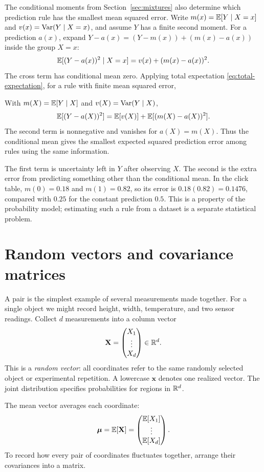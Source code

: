 The conditional moments from Section~\ref{sec:mixtures} also determine
which prediction rule has the smallest mean squared error. Write
\(m(x)=\mathbb{E}[Y\mid X=x]\) and \(v(x)=\operatorname{Var}(Y\mid X=x)\), and assume
\(Y\) has a finite second moment. For a prediction \(a(x)\), expand
\(Y-a(x)=(Y-m(x))+(m(x)-a(x))\) inside the group \(X=x\):
\[
  \mathbb{E}[(Y-a(x))^2\mid X=x]
  =v(x)+(m(x)-a(x))^2.
\]
The cross term has conditional mean zero. Applying total expectation
\eqref{eq:total-expectation}, for a rule with finite mean squared error,
\begin{result}
With \(m(X)=\mathbb{E}[Y\mid X]\) and \(v(X)=\operatorname{Var}(Y\mid X)\),
\[
  \mathbb{E}[(Y-a(X))^2]
  =\mathbb{E}[v(X)]+\mathbb{E}[(m(X)-a(X))^2].
\]
The second term is nonnegative and vanishes for \(a(X)=m(X)\).
Thus the conditional mean gives the smallest expected squared prediction
error among rules using the same information.
\end{result}
The first term is uncertainty left in \(Y\) after observing \(X\).
The second is the extra error from predicting something other than the
conditional mean. In the click table,
\(m(0)=0.18\) and \(m(1)=0.82\), so its error is
\(0.18(0.82)=0.1476\), compared with \(0.25\) for the constant
prediction \(0.5\). This is a property of the probability model;
estimating such a rule from a dataset is a separate statistical problem.

\section{Random vectors and covariance matrices}
\label{sec:random-vectors}

A pair is the simplest example of several measurements made together.
For a single object we might record height, width, temperature, and two
sensor readings. Collect \(d\) measurements into a column vector
\[
  \mathbf X=
  \begin{pmatrix}X_1\\ \vdots\\ X_d\end{pmatrix}\in\mathbb{R}^d.
\]
This is a \emph{random vector}: all coordinates refer to the same
randomly selected object or experimental repetition. A lowercase
\(\mathbf x\) denotes one realized vector. The joint distribution
specifies probabilities for regions in \(\mathbb{R}^d\).

The mean vector averages each coordinate:
\[
  \boldsymbol\mu=\mathbb{E}[\mathbf X]
  =\begin{pmatrix}\mathbb{E}[X_1]\\ \vdots\\ \mathbb{E}[X_d]\end{pmatrix}.
\]
To record how every pair of coordinates fluctuates together, arrange
their covariances into a matrix.

